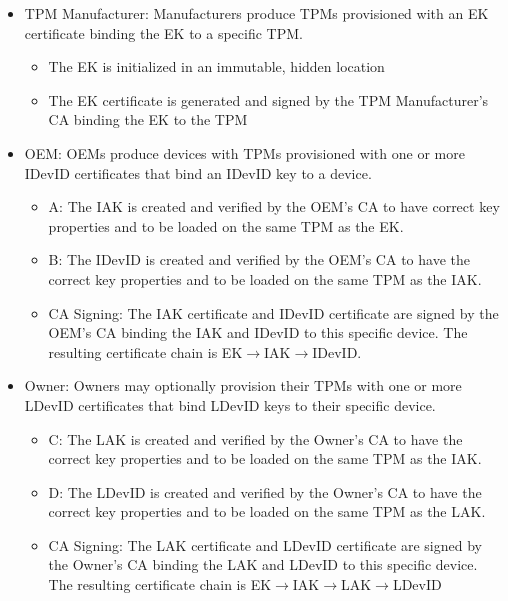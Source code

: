 \documentclass[runningheads]{llncs}
\begin{document}
\begin{itemize}[itemsep=0pt,parsep=0pt,partopsep=0pt]
\item \textsf{TPM Manufacturer}: Manufacturers produce TPMs provisioned with an
  EK certificate binding the EK to a specific TPM.
  \begin{itemize}[itemsep=0pt,parsep=0pt,partopsep=0pt]
  \item The EK is initialized in an immutable, hidden location
  \item The EK certificate is generated and signed by the TPM
    Manufacturer's CA binding the EK to the TPM
  \end{itemize}
\item \textsf{OEM}: OEMs produce devices with TPMs provisioned with
  one or more IDevID certificates that bind an IDevID key to a device.
  \begin{itemize}[itemsep=0pt,parsep=0pt,partopsep=0pt]
  \item \textsf{A}: The IAK is created and verified by the OEM's CA to
    have correct key properties and to be loaded on the same TPM
    as the EK.
  \item \textsf{B}: The IDevID is created and verified by the OEM's CA
    to have the correct key properties and to be loaded on the same
    TPM as the IAK.
  \item \textsf{CA Signing}: The IAK certificate and IDevID
    certificate are signed by the OEM's CA binding the IAK and IDevID
    to this specific device.  The resulting certificate chain is
    EK$\rightarrow$IAK$\rightarrow$IDevID.
  \end{itemize}
\item \textsf{Owner}: Owners may optionally provision their TPMs with
  one or more LDevID certificates that bind LDevID keys to their
  specific device.
  \begin{itemize}[itemsep=0pt,parsep=0pt,partopsep=0pt]
  \item \textsf{C}: The LAK is created and verified by the Owner's CA
    to have the correct key properties and to be loaded on the same
    TPM as the IAK.
  \item \textsf{D}: The LDevID is created and verified by the Owner's
    CA to have the correct key properties and to be loaded on the same
    TPM as the LAK.
  \item \textsf{CA Signing}: The LAK certificate and LDevID
    certificate are signed by the Owner's CA binding the LAK and
    LDevID to this specific device.  The resulting certificate chain
    is EK$\rightarrow$IAK$\rightarrow$LAK$\rightarrow$LDevID
  \end{itemize}
\end{itemize}
\end{document}
